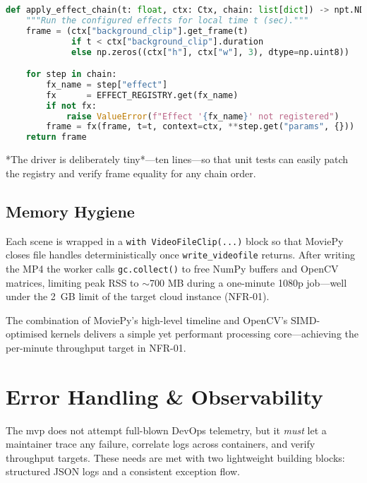\begin{lstlisting}[language=python,caption={Effect-chain executor},
                   basicstyle=\scriptsize\ttfamily,
                   label={lst:apply-chain}]
def apply_effect_chain(t: float, ctx: Ctx, chain: list[dict]) -> npt.NDArray:
    """Run the configured effects for local time t (sec)."""
    frame = (ctx["background_clip"].get_frame(t)
             if t < ctx["background_clip"].duration
             else np.zeros((ctx["h"], ctx["w"], 3), dtype=np.uint8))

    for step in chain:
        fx_name = step["effect"]
        fx      = EFFECT_REGISTRY.get(fx_name)
        if not fx:
            raise ValueError(f"Effect '{fx_name}' not registered")
        frame = fx(frame, t=t, context=ctx, **step.get("params", {}))
    return frame
\end{lstlisting}

*The driver is deliberately tiny*—ten lines—so that unit tests can easily
patch the registry and verify frame equality for any chain order.

\subsection{Memory Hygiene}
\label{sec:mem-hygiene}

Each scene is wrapped in a \texttt{with VideoFileClip(...)} block so that
MoviePy closes file handles deterministically once \texttt{write\_videofile}
returns.  After writing the MP4 the worker calls \texttt{gc.collect()} to free
NumPy buffers and OpenCV matrices, limiting peak RSS to \(\sim\)700 MB during a
one-minute 1080p job—well under the \SI{2}{GB} limit of the target cloud
instance (NFR-01).

\bigskip
The combination of MoviePy’s high-level timeline and OpenCV’s SIMD-optimised
kernels delivers a simple yet performant processing core—achieving the
per-minute throughput target in NFR-01.

\section{Error Handling \& Observability}
\label{sec:impl-logging}

The \gls{mvp} does not attempt full-blown DevOps telemetry, but it \emph{must}
let a maintainer trace any failure, correlate logs across containers, and
verify throughput targets.  These needs are met with two lightweight
building blocks: structured JSON logs and a consistent
exception flow.

